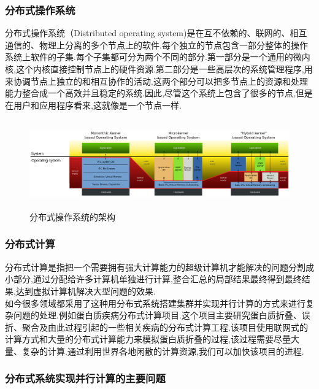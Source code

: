 \documentclass[paper=a4]{ctexart} %
\numberwithin{equation}{section} %
\numberwithin{figure}{section} %
\numberwithin{table}{section} %
\newcommand{\n}{\\\indent}
\begin{document}
\subsubsection{分布式操作系统}
分布式操作系统（Distributed operating system)是在互不依赖的、联网的、相互通信的、物理上分离的多个节点上的软件.每个独立的节点包含一部分整体的操作系统上软件的子集.每个子集都可分为两个不同的部分.第一部分是一个通用的微内核,这个内核直接控制节点上的硬件资源.第二部分是一些高层次的系统管理程序,用来协调节点上独立的和相互协作的活动.这两个部分可以把多节点上的资源和处理能力整合成一个高效并且稳定的系统.因此,尽管这个系统上包含了很多的节点,但是在用户和应用程序看来,这就像是一个节点一样.

\begin{figure}[htbp]
\centering
\includegraphics[width=4.8in,height=1.5in]{pic/distribute_os.png}
\caption{分布式操作系统的架构}
\end{figure}


\subsubsection{分布式计算}
分布式计算是指把一个需要拥有强大计算能力的超级计算机才能解决的问题分割成小部分,通过分配给许多计算机单独进行计算,整合汇总的局部结果最终得到最终结果,达到虚拟计算机解决大型问题的效果.\n
如今很多领域都采用了这种用分布式系统搭建集群并实现并行计算的方式来进行复杂问题的处理.例如蛋白质疾病分布式计算项目.这个项目主要研究蛋白质折叠、误折、聚合及由此过程引起的一些相关疾病的分布式计算工程.该项目使用联网式的计算方式和大量的分布式计算能力来模拟蛋白质折叠的过程,该过程需要尽量大量、复杂的计算.通过利用世界各地闲散的计算资源,我们可以加快该项目的进程.

\subsubsection{分布式系统实现并行计算的主要问题}
\end{document}
